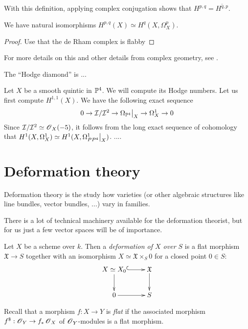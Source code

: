 With this definition, applying complex conjugation shows that $H^{p,q}=\overline{H^{q,p}}$.

\begin{lemma}
We have natural isomorphisms $H^{p,q}(X) \simeq H^q(X,\Omega_X^p)$. 
\end{lemma}
\begin{proof}
Use that the de Rham complex is flabby
\end{proof}

For more details on this and other details from complex geometry, see  \cite{voisin_complexalg}.

The ``Hodge diamond'' is 
...

\begin{example}
Let $X$ be a smooth quintic in $\mathbb{P}^4$. We will compute its Hodge numbers. Let us first compute $H^{1,1}(X)$. We have the following exact sequence
$$
0 \to \mathcal I/\mathcal I^2 \to \restr{\Omega_{\PP^4}}{X} \to \Omega_X^1 \to 0
$$
Since $\mathcal I/\mathcal I^2 \simeq \operatorname{\mathscr{O}}_X(-5)$, it follows from the long exact sequence of cohomology that $H^1(X,\Omega^1_X) \simeq H^1(X, \restr{\Omega^1_{PP^4}}{X})$. 
....
\end{example}

\section{Deformation theory}

Deformation theory is the study how varieties (or other algebraic structures like line bundles, vector bundles, ...) vary in families. 

There is a lot of technical machinery available for the deformation theorist, but for us just a few vector spaces will be of importance.

\begin{defi}
Let $X$ be a scheme over $k$. Then a \emph{deformation of $X$ over $S$} is a flat morphism $\mathfrak X \to S$ together with an isomorphism $X \simeq \mathfrak X \times_S 0$ for a closed point $0 \in S$:
$$
\xymatrix{
X \simeq X_0 \ar@{^{(}->}[r] \ar[d] &  \mathfrak X \ar[d] \\
0 \ar[r] & S
}
$$
\end{defi}

Recall that a morphism $f:X \to Y$ is \emph{flat} if the associated morphism $f^{\$}:\operatorname{\mathscr{O}}_Y \to f_\ast \operatorname{\mathscr{O}}_X$ of $\operatorname{\mathscr{O}}_Y$-modules is a flat morphism.



